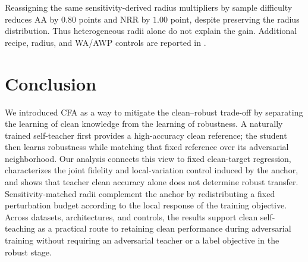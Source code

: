 \documentclass{article} %
\theoremstyle{plain}
\begin{document}
Reassigning the same sensitivity-derived radius multipliers by sample
difficulty reduces AA by \(0.80\) points and NRR by \(1.00\) point, despite
preserving the radius distribution. Thus heterogeneous radii alone do not
explain the gain. Additional recipe, radius, and WA/AWP controls are reported
in .

\section{Conclusion}
We introduced CFA as a way to mitigate the clean--robust trade-off by
separating the learning of clean knowledge from the learning of robustness. A
naturally trained self-teacher first provides a high-accuracy clean reference;
the student then learns robustness while matching that fixed reference over
its adversarial neighborhood. Our analysis connects this view to fixed
clean-target regression, characterizes the joint fidelity and local-variation
control induced by the anchor, and shows that teacher clean accuracy alone
does not determine robust transfer. Sensitivity-matched radii complement the
anchor by redistributing a fixed perturbation budget according to the local
response of the training objective. Across datasets, architectures, and
controls, the results support clean self-teaching as a practical route to
retaining clean performance during adversarial training without requiring an
adversarial teacher or a label objective in the robust stage.





\end{document}
